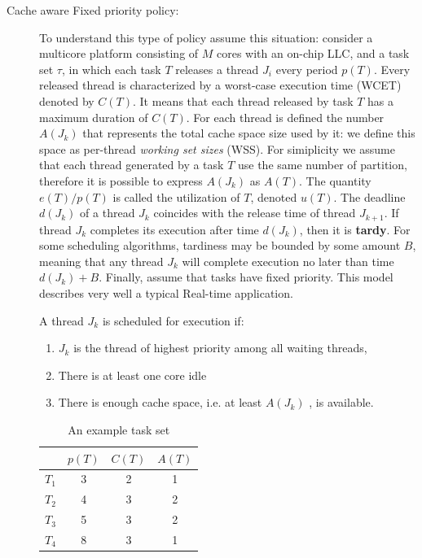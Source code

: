 \begin{description}
\item[Cache aware Fixed priority policy:] To understand this type of policy assume this situation: consider a multicore platform consisting of $M$ cores 
with an on-chip LLC, and a task set $\tau$, in which each task $T$ releases a thread $J_i$ every period $p(T)$. Every released thread is characterized by a 
worst-case execution time (WCET) denoted by $C(T)$. It means that each thread released by task $T$ has a maximum duration of $C(T)$. For each thread is 
defined the number $A(J_k)$ that represents the total cache space size used by it: we define this space as per-thread \textit{working set sizes} (WSS). 
For simiplicity we assume that each thread generated by a task $T$ use the same number of partition, therefore it is possible to express $A(J_k)$ as $A(T)$. 
The quantity $e(T)/p(T)$ is called the utilization of $T$, denoted $u(T)$. The deadline $d(J_k)$ of a thread $J_k$ coincides with the release time of thread 
$J_{k+1}$. If thread $J_k$ completes its execution after time $d(J_k)$, then it is \textbf{tardy}. For some scheduling algorithms, tardiness may be bounded 
by some amount $B$, meaning that any thread $J_k$ will complete execution no later than time $d(J_k)+B$. Finally, assume that tasks have fixed priority.
This model describes very well a typical Real-time application.

A thread $J_k$ is scheduled for execution if:

\begin{enumerate}
	\item $J_k$ is the thread of highest priority among all waiting threads,
	\item There is at least one core idle
	\item There is enough cache space, i.e. at least $A(J_k)$ , is available.
\end{enumerate}

\begin{table}[htbp]
\begin{center}
\begin{tabular}{l|c|c|c}
	\hline
	& $p(T)$ & $C(T)$ & $A(T)$ \\ \hline
	$T_1$ & 3 & 2 & 1 \\ \hline
	$T_2$ & 4 & 3 & 2 \\ \hline
	$T_3$ & 5 & 3 & 2 \\ \hline
	$T_4$ & 8 & 3 & 1 \\ 
	\hline
\end{tabular}
\caption{An example task set}
\label{tab:cache_task_set}
\end{center}
\end{table}


\end{description}
